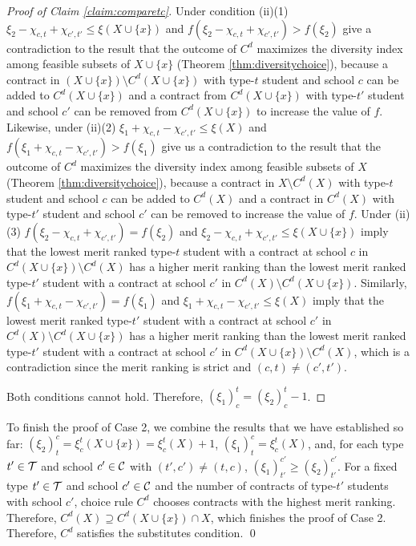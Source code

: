 \documentclass[12pt]{amsart}
\theoremstyle{remark}
\begin{document}
\begin{proof}[Proof of Claim \ref{claim:comparetc}]
Under condition (ii)(1) $\xi_2-\chi_{c,t}+\chi_{c',t'} \leq \xi(X\cup \{x\})$
and $f(\xi_2-\chi_{c,t}+\chi_{c',t'})>f(\xi_2)$ give a contradiction to the result that the
outcome of $C^d$ maximizes the diversity index among feasible subsets of $X\cup \{x\}$
(Theorem \ref{thm:diversitychoice}), because a contract in $(X\cup\{x\}) \setminus C^d(X\cup\{x\})$ with
type-$t$ student and school $c$ can be added to $C^d(X\cup\{x\})$ and a contract from
$C^d(X\cup\{x\})$ with type-$t'$ student and school $c'$ can be removed from $C^d(X\cup\{x\})$ to increase the value of $f$.
Likewise, under (ii)(2) $\xi_1+\chi_{c,t}-\chi_{c',t'}\leq \xi(X)$ and $f(\xi_1+\chi_{c,t}-\chi_{c',t'})>f(\xi_1)$
give us a contradiction to the result that the outcome of $C^d$ maximizes the diversity index among feasible subsets of $X$
(Theorem \ref{thm:diversitychoice}), because a contract in $X\setminus C^d(X)$ with type-$t$ student and
school $c$ can be added to $C^d(X)$ and a contract in $C^d(X)$ with type-$t'$ student and
school $c'$ can be removed to increase the value of $f$. Under (ii)(3)
$f(\xi_2-\chi_{c,t}+\chi_{c', t'}) = f(\xi_2)$ and $\xi_2-\chi_{c,t}+\chi_{c', t'} \leq \xi(X\cup\{x\})$ imply that the lowest merit ranked type-$t$ student with a contract
at school $c$ in $C^d(X\cup \{x\})\setminus C^d(X)$ has a higher merit ranking than the lowest merit ranked type-$t'$ student with a contract at school $c'$ in
$C^d(X) \setminus C^d(X\cup \{x\})$. Similarly, $f(\xi_1+\chi_{c,t}-\chi_{c',t'}) = f(\xi_1)$
and $\xi_1+\chi_{c,t}-\chi_{c',t'}\leq \xi(X)$ imply that the lowest merit ranked type-$t'$ student with a contract at school $c'$ in $C^d(X)\setminus C^d(X\cup \{x\})$ has a higher merit ranking than
the lowest merit ranked type-$t'$ student with a contract at school $c'$ in $C^d(X\cup \{x\}) \setminus C^d(X)$, which is a contradiction since the merit ranking is strict and $(c,t)\neq (c', t')$.

Both conditions cannot hold. Therefore, $(\xi_1)^t_c=(\xi_2)^t_c-1$.
\end{proof}

To finish the proof of Case 2, we combine the results that we have established so far:
$(\xi_2)^c_t=\xi^t_c(X\cup \{x\})=\xi^t_c(X)+1$,
$(\xi_1)^c_t=\xi^t_c(X)$, and, for each type $t'\in \mathcal{T}$ and school $c'\in \mathcal{C}$
with $(t',c')\neq (t,c)$, $(\xi_1)^{c'}_{t'} \geq (\xi_2)^{c'}_{t'}$.
For a fixed type $t'\in \mathcal{T}$ and school $c'\in \mathcal{C}$ and the number of contracts of type-$t'$ students with school $c'$, choice rule $C^d$ chooses contracts with the highest merit ranking.
Therefore, $C^d(X) \supseteq C^d(X \cup \{x\}) \cap X$, which finishes the proof of Case 2. Therefore, $C^d$ satisfies the substitutes condition.
\qed
\end{document}
